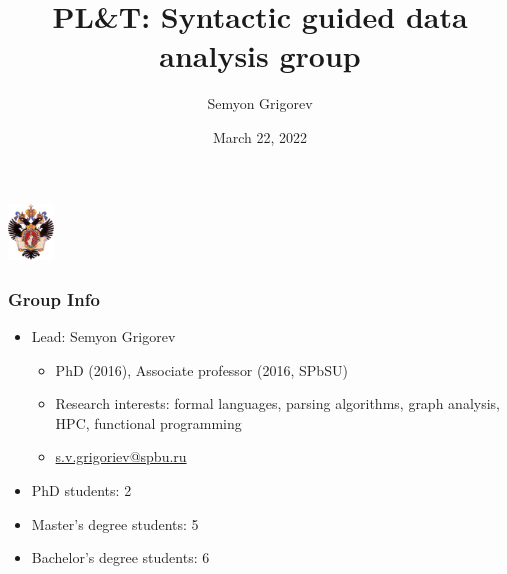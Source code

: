 \documentclass[xcolor=table,aspectratio=169]{beamer}
\title[Syntactic guided data analysis group]{PL\&T: Syntactic guided data analysis group}
\institute[PL\&T@SPbSU]{
Saint Petersburg State University
}
\author[Semyon Grigorev]{Semyon Grigorev}
\date{March 22, 2022}
\begin{document}
{
\begin{frame}[fragile]
  \begin{table}
  \centering
  \includegraphics[height=1.5cm]{pictures/SPbGU_Logo.png}
  \end{table}
  \titlepage
\end{frame}
}



\begin{frame}[fragile]
  \frametitle{Group Info}  
  \begin{itemize}
      \item Lead: Semyon Grigorev
      \begin{itemize}
        \item PhD (2016), Associate professor (2016, SPbSU)
        \item Research interests: formal languages, parsing algorithms, graph analysis, HPC, functional programming
        \item \href{s.v.grigoriev@spbu.ru}{s.v.grigoriev@spbu.ru}
      \end{itemize}
      \item PhD students: 2
      \item Master's degree students: 5
      \item Bachelor's degree students: 6
    \end{itemize}
\end{frame}
\end{document}
